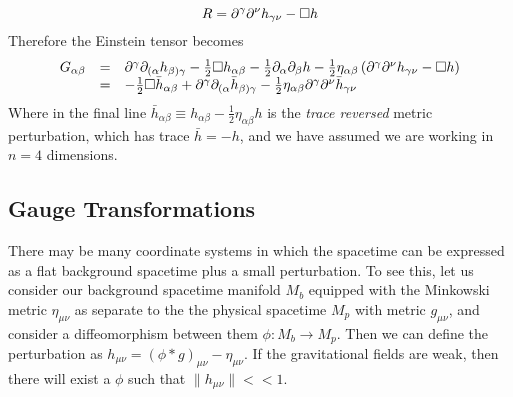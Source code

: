 \begin{equation}
R={\partial}^\gamma {\partial}^\nu h_{\gamma \nu}-\Box h
\end{equation}
Therefore the Einstein tensor becomes 
\begin{equation}
\begin{array}{lcl}
G_{\alpha \beta} &=& {\partial}^\gamma {\partial}_{( \alpha}h_{\beta ) \gamma} - \frac{1}{2} \Box h_{\alpha \beta} -\frac{1}{2}{\partial}_\alpha {\partial}_\beta h -\frac{1}{2}\eta_{\alpha \beta} \left( {\partial}^\gamma {\partial}^\nu h_{\gamma \nu}-\Box h \right) \\
&=& -\frac{1}{2}\Box \bar{h}_{\alpha \beta}+ {\partial}^\gamma {\partial}_{( \alpha}\bar{h}_{\beta ) \gamma} -\frac{1}{2}\eta_{\alpha \beta}{\partial}^\gamma {\partial}^\nu \bar{h}_{\gamma \nu}
\end{array}
\label{eq:LinearisedG}
\end{equation}
Where in the final line $\bar{h}_{\alpha \beta}\equiv h_{\alpha \beta} - \frac{1}{2} \eta_{\alpha \beta} h$ is the \emph{trace reversed} metric perturbation, which has trace $\bar{h}=-h$, and we have assumed we are working in $n=4$ dimensions.

\subsection{Gauge Transformations}
There may be many coordinate systems in which the spacetime can be expressed as a flat background spacetime plus a small perturbation. To see this, let us consider our background spacetime manifold $M_b$ equipped with the Minkowski metric $\eta_{\mu \nu}$ as separate to the the physical spacetime $M_p$ with metric $g_{\mu \nu}$, and consider a diffeomorphism between them $\phi: M_b \rightarrow M_p$. Then we can define the perturbation as $h_{\mu \nu}=(\phi {*} g)_{\mu \nu} - \eta_{\mu \nu}$. If the gravitational fields are weak, then there will exist a $\phi$ such that $\| h_{\mu \nu} \| << 1$. 

